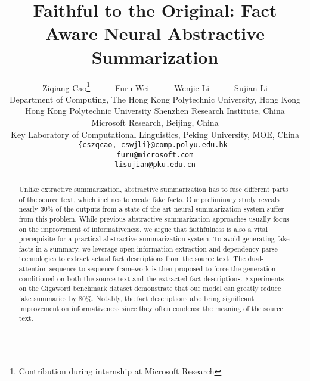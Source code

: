 \documentclass[letterpaper]{article} \usepackage{aaai18}  \usepackage{times}  \usepackage{helvet}  \usepackage{courier}  \usepackage{url}  \usepackage{graphicx}  \usepackage{amsfonts}
\begin{document}
\title{Faithful to the Original: Fact Aware Neural Abstractive Summarization}
	\author{
			Ziqiang Cao\thanks{Contribution during internship at Microsoft Research}   ~~ ~~ Furu Wei ~~ ~~ Wenjie Li ~~ ~~ Sujian Li\\
		Department of Computing, The Hong Kong Polytechnic University, Hong Kong\\
		Hong Kong Polytechnic University Shenzhen Research Institute, China \\
		Microsoft Research, Beijing, China\\
		Key Laboratory of Computational Linguistics, Peking University, MOE, China \\
		{\tt \{cszqcao, cswjli\}@comp.polyu.edu.hk  } \\
		{\tt furu@microsoft.com} \\
		{\tt lisujian@pku.edu.cn} \\
	}
	\maketitle
	\begin{abstract}
		Unlike extractive summarization, abstractive summarization has to fuse different parts of the source text, which inclines to create fake facts.
		Our preliminary study reveals nearly 30\% of the outputs from a state-of-the-art neural summarization system suffer from this problem.
		While previous abstractive summarization approaches usually focus on the improvement of informativeness, we argue that faithfulness is also a vital prerequisite for a practical abstractive summarization system.
		To avoid generating fake facts in a summary, we leverage open information extraction and dependency parse technologies to extract actual fact descriptions from the source text.
		The dual-attention sequence-to-sequence framework is then proposed to force the generation conditioned on both the source text and the extracted fact descriptions.
		Experiments on the Gigaword benchmark dataset demonstrate that our model can greatly reduce fake summaries by 80\%.
		Notably, the fact descriptions also bring significant improvement on informativeness since they often condense the meaning of the source text.
	\end{abstract}
	
\end{document}
